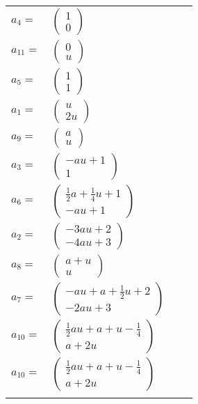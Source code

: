 \documentclass[1p]{elsarticle_modified}
\theoremstyle{definition}
\begin{document}
\begin{tabular}{m{7pt} m{180pt} m{7pt} m{180pt} }
\flushright $a_{4}=$&$\begin{pmatrix}1\\0\end{pmatrix}$ \\
\flushright $a_{11}=$&$\begin{pmatrix}0\\u\end{pmatrix}$ \\
\flushright $a_{5}=$&$\begin{pmatrix}1\\1\end{pmatrix}$ \\
\flushright $a_{1}=$&$\begin{pmatrix}u\\2 u\end{pmatrix}$ \\
\flushright $a_{9}=$&$\begin{pmatrix}a\\u\end{pmatrix}$ \\
\flushright $a_{3}=$&$\begin{pmatrix}- a u+1\\1\end{pmatrix}$ \\
\flushright $a_{6}=$&$\begin{pmatrix}\frac{1}{2} a+\frac{1}{4} u+1\\- a u+1\end{pmatrix}$ \\
\flushright $a_{2}=$&$\begin{pmatrix}-3 a u+2\\-4 a u+3\end{pmatrix}$ \\
\flushright $a_{8}=$&$\begin{pmatrix}a+u\\u\end{pmatrix}$ \\
\flushright $a_{7}=$&$\begin{pmatrix}- a u+a+\frac{1}{2} u+2\\-2 a u+3\end{pmatrix}$ \\
\flushright $a_{10}=$&$\begin{pmatrix}\frac{1}{2} a u+a+u-\frac{1}{4}\\a+2 u\end{pmatrix}$\\ \flushright $a_{10}=$&$\begin{pmatrix}\frac{1}{2} a u+a+u-\frac{1}{4}\\a+2 u\end{pmatrix}$\\&\end{tabular}
\end{document}
